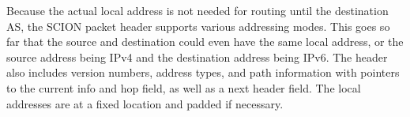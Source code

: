 Because the actual local address is not needed for routing until the destination AS, the SCION packet header supports various addressing modes. This goes so far that the source and destination could even have the same local address, or the source address being IPv4 and the destination address being IPv6.
The header also includes version numbers, address types, and path information with pointers to the current info and hop field, as well as a next header field. The local addresses are at a fixed location and padded if necessary.\\

